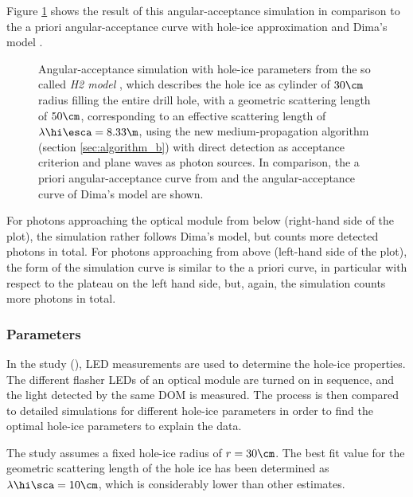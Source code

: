 
Figure \ref{fig:xaeg2Mee} shows the result of this angular-acceptance simulation in comparison to the a priori angular-acceptance curve with hole-ice approximation \cite{icepaper} and Dima's model \cite{flasherdataderivedicemodels}.

\begin{figure}[htbp]
  \caption{Angular-acceptance simulation with hole-ice parameters from the so called \textit{H2 model} \cite{holeicestudieswithyag}, which describes the hole ice as cylinder of $30\cm$ radius filling the entire drill hole, with a geometric scattering length of $50\cm$, corresponding to an effective scattering length of $\lambda\hi\esca = 8.33\m$, using the new medium-propagation algorithm (section \ref{sec:algorithm_b}) with direct detection as acceptance criterion and plane waves as photon sources. In comparison, the a priori angular-acceptance curve from \cite{icepaper} and the angular-acceptance curve of Dima's model \cite{flasherdataderivedicemodels} are shown.}
  \label{fig:xaeg2Mee}
\end{figure}

For photons approaching the optical module from below (right-hand side of the plot), the simulation rather follows Dima's model, but counts more detected photons in total. For photons approaching from above (left-hand side of the plot), the form of the simulation curve is similar to the a priori curve, in particular with respect to the plateau on the left hand side, but, again, the simulation counts more photons in total.


\subsubsection{ Parameters}
\label{sec:dard_parameters}

In the  study (), LED measurements are used to determine the hole-ice properties. The different flasher LEDs of an optical module are turned on in sequence, and the light detected by the same DOM is measured. The process is then compared to detailed  simulations for different hole-ice parameters in order to find the optimal hole-ice parameters to explain the data. \cite{martindardupdate, martinspicehddard}

The  study assumes a fixed hole-ice radius of $r=30\cm$. The best fit value for the geometric scattering length of the hole ice has been determined as $\lambda\hi\sca = 10\cm$, which is considerably lower than other estimates. \cite{martindardupdate}

